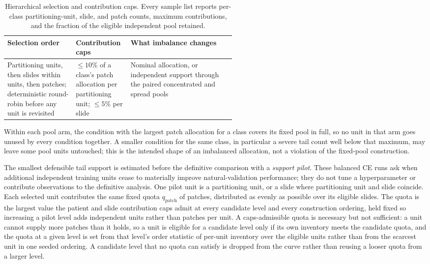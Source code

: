 \documentclass[11pt]{article}
\begin{document}
\begin{table}[ht]
  \centering
  \footnotesize
  \begin{tabularx}{\linewidth}{@{}>{\raggedright\arraybackslash}p{0.30\linewidth}>{\raggedright\arraybackslash}p{0.24\linewidth}X@{}}
    \toprule
    Selection order & Contribution caps & What imbalance changes \\
    \midrule
    Partitioning units, then slides within units, then patches; deterministic round-robin before any unit is revisited & $\leq10\%$ of a class's patch allocation per partitioning unit; $\leq5\%$ per slide & Nominal allocation, or independent support through the paired concentrated and spread pools \\
    \bottomrule
  \end{tabularx}
  \caption{Hierarchical selection and contribution caps. Every sample list reports per-class partitioning-unit, slide, and patch counts, maximum contributions, and the fraction of the eligible independent pool retained.}
  \label{tab:support-rules}
\end{table}

\noindent Within each pool arm, the condition with the largest patch allocation for a class covers its fixed pool in full, so no unit in that arm goes unused by every condition together. A smaller condition for the same class, in particular a severe tail count well below that maximum, may leave some pool units untouched; this is the intended shape of an imbalanced allocation, not a violation of the fixed-pool construction.

The smallest defensible tail support is estimated before the definitive comparison with a \emph{support pilot}. These balanced CE runs ask when additional independent training units cease to materially improve natural-validation performance; they do not tune a hyperparameter or contribute observations to the definitive analysis. One pilot unit is a partitioning unit, or a slide where partitioning unit and slide coincide. Each selected unit contributes the same fixed quota $q_{\mathrm{patch}}$ of patches, distributed as evenly as possible over its eligible slides. The quota is the largest value the patient and slide contribution caps admit at every candidate level and every construction ordering, held fixed so increasing a pilot level adds independent units rather than patches per unit. A caps-admissible quota is necessary but not sufficient: a unit cannot supply more patches than it holds, so a unit is eligible for a candidate level only if its own inventory meets the candidate quota, and the quota at a given level is set from that level's order statistic of per-unit inventory over the eligible units rather than from the scarcest unit in one seeded ordering. A candidate level that no quota can satisfy is dropped from the curve rather than reusing a looser quota from a larger level.
\end{document}
